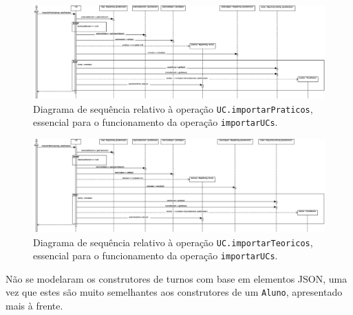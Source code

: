 \documentclass[12pt, a4paper]{article}
\begin{document}
\begin{landscape}
        \vspace*{\fill}
        \pagebreak
        \vspace*{\fill}

        \begin{figure}[H]
            \centering
            \includegraphics[scale=0.50]{Imagens/Modelos/importarUCsConstrutorUCimportarPraticos.svg.eps}
            \caption{
                Diagrama de sequência relativo à operação \texttt{UC.importarPraticos}, essencial para o
                funcionamento da operação \texttt{importarUCs}.
            }
        \end{figure}

        \vspace*{\fill}
        \pagebreak
        \vspace*{\fill}

        \begin{figure}[H]
            \centering
            \includegraphics[scale=0.50]{Imagens/Modelos/importarUCsConstrutorUCimportarTeoricos.svg.eps}
            \caption{
                Diagrama de sequência relativo à operação \texttt{UC.importarTeoricos}, essencial para o
                funcionamento da operação \texttt{importarUCs}.
            }
        \end{figure}

        Não se modelaram os construtores de turnos com base em elementos JSON, uma vez que estes são
        muito semelhantes aos construtores de um \texttt{Aluno}, apresentado mais à frente.

        \vspace*{\fill}
        \pagebreak
        \vspace*{\fill}


\end{landscape}
\end{document}

